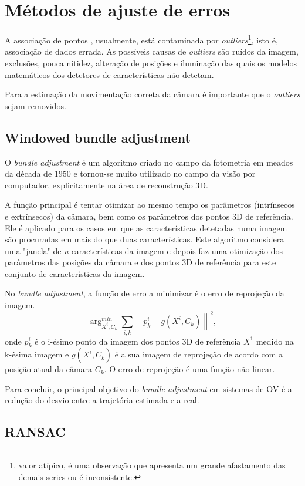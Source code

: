 \section{Métodos de ajuste de erros}

A associação de pontos , usualmente, está contaminada por \textit{outliers}\footnote{valor atípico, é uma observação que apresenta um grande afastamento das demais series ou é inconsistente.}, isto é, associação de dados errada. As possíveis causas de \textit{outliers} são ruídos da imagem, exclusões, pouca nitidez, alteração de posições e iluminação das quais os modelos matemáticos dos detetores de características não detetam. 

Para  a estimação da movimentação correta da câmara é importante que o \textit{outliers} sejam removidos. 

\subsection{Windowed bundle adjustment}

O \textit{bundle adjustment} é um algoritmo criado no campo da fotometria em meados da década de 1950 e tornou-se muito utilizado no campo da visão por computador, explicitamente na área de reconstrução 3D.

A função principal é tentar otimizar ao mesmo tempo os parâmetros (intrínsecos e extrínsecos) da câmara, bem como os parâmetros dos pontos 3D de referência. Ele é aplicado para os casos em que as características detetadas numa imagem são procuradas em mais do que duas características. Este algoritmo considera uma "janela" de \textit{n} características da imagem e depois faz uma otimização dos parâmetros das posições da câmara e dos pontos 3D de referência para este conjunto de características da imagem.

No \textit{bundle adjustment}, a função de erro a minimizar é o erro de reprojeção da imagem. 
\[ \arg_{X^i,C_k}^{min} \sum_{i,k}{\left \| p_k^i - g(X^i ,C_k) \right \|}^2 ,\]
onde $p_k^i$ é o i-ésimo ponto da imagem dos pontos 3D de referência \textit{$X^1$} medido na k-ésima imagem e $\textit{g}(X^i,C_k)$ é a sua imagem de reprojeção de acordo com a posição atual da câmara $C_k$. O erro de reprojeção é uma função não-linear.

Para concluir, o principal objetivo do \textit{bundle adjustment} em sistemas de OV é a redução do desvio entre a trajetória estimada e a real.

\subsection{RANSAC}


